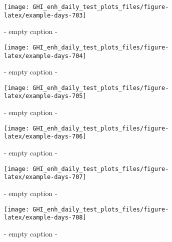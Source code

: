 \documentclass[
  10pt,
  a4paper,oneside]{article}
\begin{document}
\begin{figure}[H]

{\centering \texttt{[image: GHI\_enh\_daily\_test\_plots\_files/figure-latex/example-days-703]} 

}

\caption{ - empty caption - }\label{fig:example-days-703}
\end{figure}

\begin{figure}[H]

{\centering \texttt{[image: GHI\_enh\_daily\_test\_plots\_files/figure-latex/example-days-704]} 

}

\caption{ - empty caption - }\label{fig:example-days-704}
\end{figure}

\begin{figure}[H]

{\centering \texttt{[image: GHI\_enh\_daily\_test\_plots\_files/figure-latex/example-days-705]} 

}

\caption{ - empty caption - }\label{fig:example-days-705}
\end{figure}

\begin{figure}[H]

{\centering \texttt{[image: GHI\_enh\_daily\_test\_plots\_files/figure-latex/example-days-706]} 

}

\caption{ - empty caption - }\label{fig:example-days-706}
\end{figure}

\begin{figure}[H]

{\centering \texttt{[image: GHI\_enh\_daily\_test\_plots\_files/figure-latex/example-days-707]} 

}

\caption{ - empty caption - }\label{fig:example-days-707}
\end{figure}

\begin{figure}[H]

{\centering \texttt{[image: GHI\_enh\_daily\_test\_plots\_files/figure-latex/example-days-708]} 

}

\caption{ - empty caption - }\label{fig:example-days-708}
\end{figure}
\end{document}
